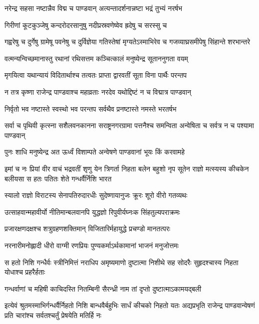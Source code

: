 \twolineshloka
{नरेन्द्र सहसा नष्टान्नैव विद्म च पाण्डवान्}
{अत्यन्तादर्शनान्नष्टा भद्रं तुभ्यं नरर्षभ}


\twolineshloka
{गिरीणां कूटकुञ्जेषु कन्दरोदरसानुषु}
{नदीप्रस्रवणेष्वेव ह्रदेषु च सरस्सु च}


\threelineshloka
{गह्वरेषु च दुर्गेषु ग्रामेषू पवनेषु च}
{दुर्विज्ञेया गतिस्तेषां मृग्यतेऽस्माभिरेव च}
{गजव्याघ्रसमीपेषु सिंहान्ते शरभान्तरे}


\twolineshloka
{वत्मन्यन्विच्छमानास्तु रथानां रथिसत्तम}
{कञ्चित्कालं मनुष्येन्द्र सूताननुगता वयम्}


\twolineshloka
{मृगयित्वा यथान्यायं विदितार्थाश्च तत्वतः}
{प्राप्ता द्वारवतीं सूता विना पार्थैः परन्तप}


\twolineshloka
{न तत्र कृष्णा राजेन्द्र पाण्डवाश्च महाव्रताः}
{नरदेव यथोद्दिष्टं न च विद्मात्र पाण्डवान्}


\twolineshloka
{निर्वृतो भव नष्टास्ते स्वस्थो भव परन्तप}
{सर्वथैव प्रनष्टास्ते नमस्ते भरतर्षभ}


\threelineshloka
{सर्वा च पृथिवी कृत्स्ना सशैलवनकानना}
{सराष्ट्रनगरग्रामा पत्तनैश्च समन्विता}
{अन्वेषिता च सर्वत्र न च पश्यामा पाण्डवान्}


\twolineshloka
{पुनः शाधि मनुष्येन्द्र अत ऊर्ध्वं विशाम्पते}
{अन्वेषणे पाण्डवानां भूयः किं करवामहे}


\onelineshloka
{इमां च नः प्रियां वीर वाचं भद्रवतीं शृणु}
\threelineshloka
{येन त्रिगर्ता निहता बलेन बहुशो नृप}
{सूतेन राज्ञो मत्स्यस्य कीचकेन बलीयसा}
{स हतः पतितः शेते गन्धर्वैर्निशि भारत}


\twolineshloka
{स्यालो राज्ञो विराटस्य सेनापतिरुदारधीः}
{सुदेष्णायानुजः क्रूरः शूरो वीरो गतव्यथः}


\twolineshloka
{उत्साहवान्महावीर्यो नीतिमान्बलवानपि}
{युद्धज्ञो रिपुवीर्यघ्नःक सिंहतुल्यपराक्रमः}


\twolineshloka
{प्रजारक्षणदक्षश्च शत्रुग्रहणशक्तिमान्}
{विजितारिर्महायुद्धे प्रचण्डो मानतत्परः}


\twolineshloka
{नरनारीमनोह्लादी धीरो वाग्मी रणप्रियः}
{पुण्यकर्माऽर्थकामानां भाजनं मनुजोत्तमः}


\threelineshloka
{स हतो निशि गन्धैर्वः स्त्रीनिमित्तं नराधिप}
{अमृष्यमाणो दुष्टात्मा निशीथे सह सोदरैः}
{सुहृदश्चास्य निहता योधाश्च प्रहरैर्हताः}


\twolineshloka
{गन्धर्वाणां च महिषी काचिदस्ति नितम्बिनी}
{सैरन्ध्री नाम तां दृप्तो दुष्टात्माऽकामयद्बली}


\onelineshloka
{इत्येवं श्रुतमस्माभिर्गन्धर्वैर्निहतो निशि}
\threelineshloka
{बान्धवैर्बहुभिः सार्धं कीचको निहतो यतः}
{अद्यप्रभृति राजेन्द्र पाण्डवान्वेषणं प्रति}
{चारांश्च सर्वतश्चर्तुं प्रेषयेति मतिर्हि नः}


